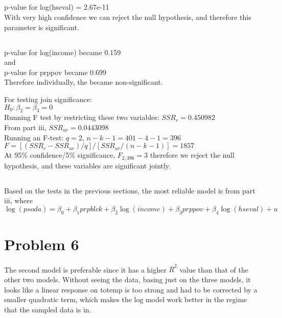 \documentclass[11pt, oneside]{article}   	%
\begin{document}
\subsection{}
p-value for log(hseval) = 2.67e-11\\
With very high confidence we can reject the null hypothesis, and therefore this parameter is significant.
\subsection{}
p-value for log(income) became 0.159\\ and \\
p-value for prppov became 0.699\\
Therefore individually, the became non-significant.

For testing join significance:\\
\indent $H_0:\beta_2=\beta_3=0$\\
Running F test by restricting these two variables:
$SSR_r=0.450982$\\
From part iii,
$SSR_{ur}=0.0443098$\\
Running an F-test:
$q = 2$, $n-k-1=401-4-1=396$\\
$F=[(SSR_r-SSR_{ur})/q]/[SSR_{ur}/(n-k-1)]=1857$\\
At 95\% confidence/5\% significance, $F_{2,396}=3$ therefore we reject the null hypothesis, and these variables are significant jointly.

\subsection{}
Based on the tests in the previous sections, the most reliable model is from part iii, where $\log(psoda)=\beta_0+\beta_1prpblck+\beta_2\log(income)+\beta_3prppov+\beta_4\log(hseval)+u$


\section{Problem 6}
The second model is preferable since it has a higher $\overline{R}^2$ value than that of the other two models. Without seeing the data, basing just on the three models, it looks like a linear response on totemp is too strong and had to be corrected by a smaller quadratic term, which makes the log model work better in the regime that the sampled data is in.
\end{document}
